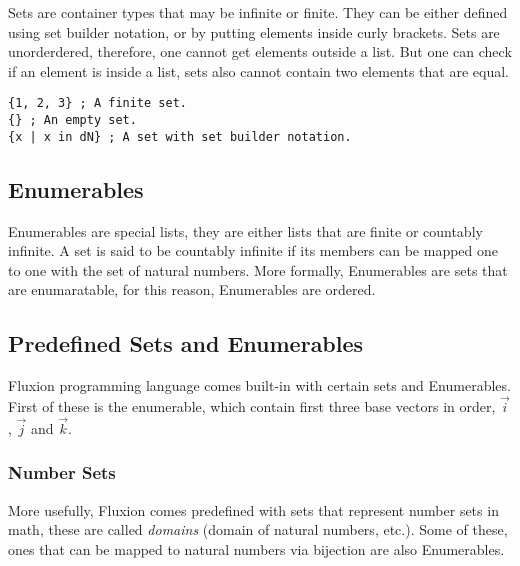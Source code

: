 \documentclass[11pt,a4paper]{book}
\begin{document}
Sets are container types that may be infinite or finite. They can be either defined using set builder notation, or by putting elements inside curly brackets. Sets are unorderdered, therefore, one cannot get elements outside a list. But one can check if an element is inside a list, sets also cannot contain two elements that are equal.

\begin{lstlisting}[caption={Example vectors},captionpos=b]
{1, 2, 3} ; A finite set.
{} ; An empty set.
{x | x in dN} ; A set with set builder notation.
\end{lstlisting}

\subsection{Enumerables}

Enumerables are special lists, they are either lists that are finite or countably infinite. A set is said to be countably infinite if its members can be mapped one to one with the set of natural numbers. More formally, Enumerables are sets that are enumaratable, for this reason, Enumerables are ordered.

\subsection{Predefined Sets and Enumerables}

Fluxion programming language comes built-in with certain sets and Enumerables. First of these is the  enumerable, which contain first three base vectors in order, $\vec{i}$, $\vec{j}$ and $\vec{k}$.

\subsubsection{Number Sets}

More usefully, Fluxion comes predefined with sets that represent number sets in math, these are called \textit{domains} (domain of natural numbers, etc.). Some of these, ones that can be mapped to natural numbers via bijection are also Enumerables.
\end{document}
